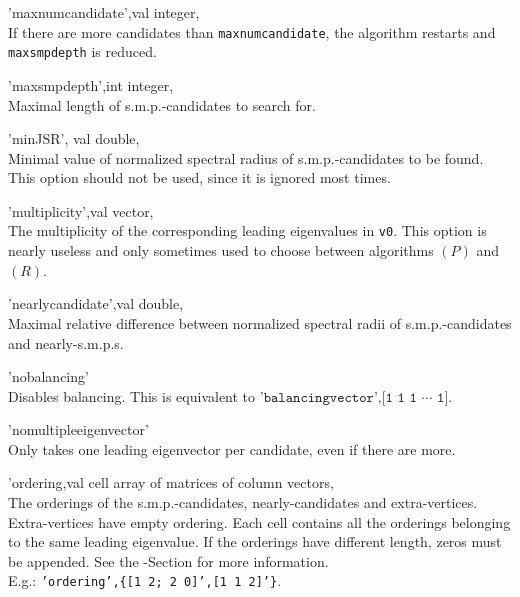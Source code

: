 \begin{param}
\item['maxnumcandidate',val] integer, \\If there are more candidates than \texttt{maxnumcandidate}, the algorithm restarts and \texttt{maxsmpdepth} is reduced.


\item['maxsmpdepth',int] integer, \\Maximal length of s.m.p.-candidates to search for.

\item['minJSR', val] double, \\Minimal value of normalized spectral radius of s.m.p.-candidates to be found. This option should not be used, since it is ignored most times.

\item['multiplicity',val] vector, \\The multiplicity of the corresponding leading eigenvalues in \texttt{v0}. This option is nearly useless and only sometimes used to choose between algorithms $(P)$ and $(R)$.

\item['nearlycandidate',val] double, \\Maximal relative difference between normalized spectral radii of s.m.p.-candidates and nearly-s.m.p.s.


\item['nobalancing'] \\Disables balancing. This is equivalent to
$\texttt{'balancingvector',[1 1 1 } \cdots \texttt{ 1]}$.

\item['nomultipleeigenvector'] \\Only takes one leading eigenvector per candidate, even if there are more.

\item['ordering,val] cell array of matrices of column vectors, \\The orderings of the s.m.p.-candidates, nearly-candidates and extra-vertices. Extra-vertices have empty ordering. Each cell contains all the orderings belonging to the same leading eigenvalue. If the orderings have different length, zeros must be appended.
See the -Section for more information.\\
E.g.: \texttt{'ordering',\{[1 2; 2 0]',[1 1 2]'\}}.


\end{param}
